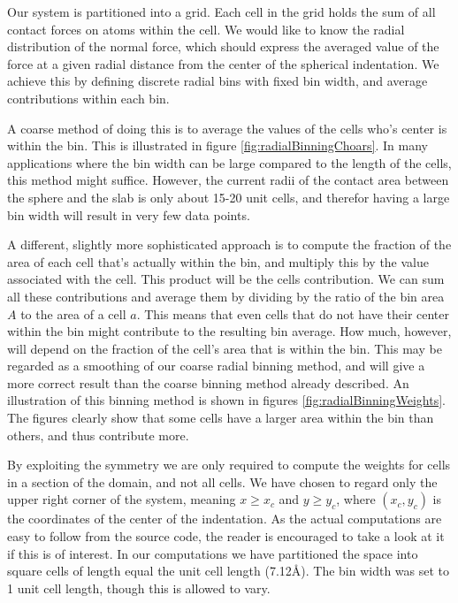\documentclass[twoside,english]{uiofysmaster}
\begin{document}
Our system is partitioned into a grid. 
Each cell in the grid holds the sum of all contact forces on atoms within the cell. 
We would like to know the radial distribution of the normal force, which should express the averaged value of the force at a given radial distance from the center of the spherical indentation.
We achieve this by defining discrete radial bins with fixed bin width, and average contributions within each bin.

A coarse method of doing this is to average the values of the cells who's center is within the bin. 
This is illustrated in figure \ref{fig:radialBinningChoars}. 
In many applications where the bin width can be large compared to the length of the cells, this method might suffice.
However, the current radii of the contact area between the sphere and the slab is only about 15-20 unit cells, and therefor having a large bin width will result in very few data points. 


A different, slightly more sophisticated approach is to compute the fraction of the area of each cell that's actually within the bin, and multiply this by the value associated with the cell. This product will be the cells contribution.
We can sum all these contributions and average them by dividing by the ratio of the bin area $A$ to the area of a cell $a$.  
This means that even cells that do not have their center within the bin might contribute to the resulting bin average. 
How much, however, will depend on the fraction of the cell's area that is within the bin.
This may be regarded as a smoothing of our coarse radial binning method, and will give a more correct result than the coarse binning method already described. 
An illustration of this binning method is shown in figures \ref{fig:radialBinningWeights}.
The figures clearly show that some cells have a larger area within the bin than others, and thus contribute more. 


By exploiting the symmetry we are only required to compute the weights for cells in a section of the domain, and not all cells. 
We have chosen to regard only the upper right corner of the system, meaning $x\geq x_c$ and $y\geq y_c$, where $(x_c, y_c)$ is the coordinates of the center of the indentation.
As the actual computations are easy to follow from the source code, the reader is encouraged to take a look at it if this is of interest. 
In our computations we have partitioned the space into square cells of length equal the unit cell length (7.12\AA).
The bin width was set to 1 unit cell length, though this is allowed to vary. 
\end{document}
